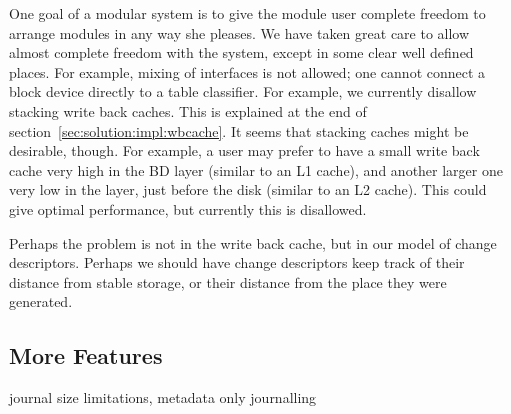 One goal of a modular system is to give the module user complete
freedom to arrange modules in any way she pleases. We have taken great
care to allow almost complete freedom with the system, except in some
clear well defined places. For example, mixing of interfaces is not
allowed; one cannot connect a block device directly to a table
classifier. For example, we currently disallow stacking write back
caches. This is explained at the end of
section~\ref{sec:solution:impl:wbcache}. It seems that stacking caches
might be desirable, though. For example, a user may prefer to have a
small write back cache very high in the BD layer (similar to an L1
cache), and another larger one very low in the layer, just before the
disk (similar to an L2 cache). This could give optimal performance,
but currently this is disallowed.

Perhaps the problem is not in the write back cache, but in our model
of change descriptors. Perhaps we should have change descriptors keep
track of their distance from stable storage, or their distance from
the place they were generated.

\subsection{More Features}
journal size limitations, metadata only journalling
